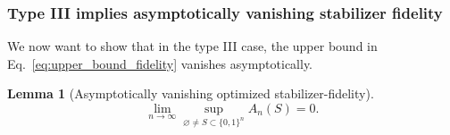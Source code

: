 \documentclass[aps,pra,reprint,superscriptaddress]{revtex4-2}
\newtheorem{lemma}[theorem]{Lemma}
\theoremstyle{definition}
\theoremstyle{remark}
\begin{document}
    \subsubsection{Type III implies asymptotically vanishing stabilizer fidelity}
        
    We now want to show that in the type III case, the upper bound in Eq.~\eqref{eq:upper_bound_fidelity} vanishes
    asymptotically.
    
    \begin{lemma}[Asymptotically vanishing optimized stabilizer-fidelity]
        \begin{equation}
          \lim_{n \rightarrow \infty}  \sup_{\varnothing\neq S \subset \{0,1 \}^n} A_n(S) = 0.
        \end{equation}
    \end{lemma}
    
\end{document}
